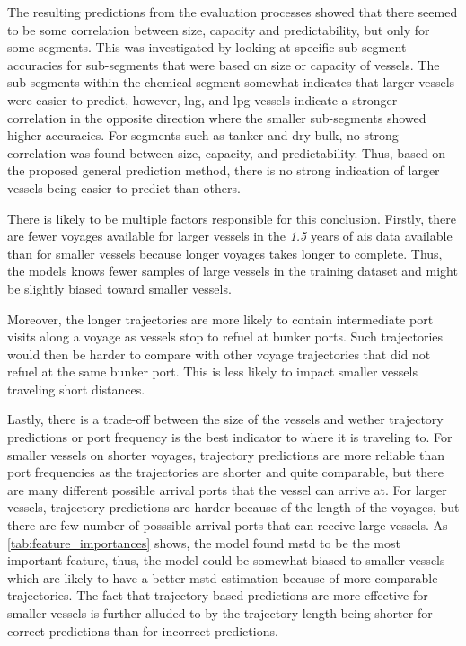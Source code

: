 The resulting predictions from the evaluation processes showed that there seemed to be some correlation between size, capacity and predictability, but only for some segments. This was investigated by looking at specific sub-segment accuracies for sub-segments that were based on size or capacity of vessels. The sub-segments within the chemical segment somewhat indicates that larger vessels were easier to predict, however, \acrshort{lng}, and \acrshort{lpg} vessels indicate a stronger correlation in the opposite direction where the smaller sub-segments showed higher accuracies. For segments such as tanker and dry bulk, no strong correlation was found between size, capacity, and predictability. Thus, based on the proposed general prediction method, there is no strong indication of larger vessels being easier to predict than others.

There is likely to be multiple factors responsible for this conclusion. Firstly, there are fewer voyages available for larger vessels in the \textit{1.5} years of \acrshort{ais} data available than for smaller vessels because longer voyages takes longer to complete. Thus, the models knows fewer samples of large vessels in the training dataset and might be slightly biased toward smaller vessels.

Moreover, the longer trajectories are more likely to contain intermediate port visits along a voyage as vessels stop to refuel at bunker ports. Such trajectories would then be harder to compare with other voyage trajectories that did not refuel at the same bunker port. This is less likely to impact smaller vessels traveling short distances.

Lastly, there is a trade-off between the size of the vessels and wether trajectory predictions or port frequency is the best indicator to where it is traveling to. For smaller vessels on shorter voyages, trajectory predictions are more reliable than port frequencies as the trajectories are shorter and quite comparable, but there are many different possible arrival ports that the vessel can arrive at. For larger vessels, trajectory predictions are harder because of the length of the voyages, but there are few number of posssible arrival ports that can receive large vessels. As \cref{tab:feature_importances} shows, the model found \acrshort{mstd} to be the most important feature, thus, the model could be somewhat biased to smaller vessels which are likely to have a better \acrshort{mstd} estimation because of more comparable trajectories. The fact that trajectory based predictions are more effective for smaller vessels is further alluded to by the trajectory length being shorter for correct predictions than for incorrect predictions.

